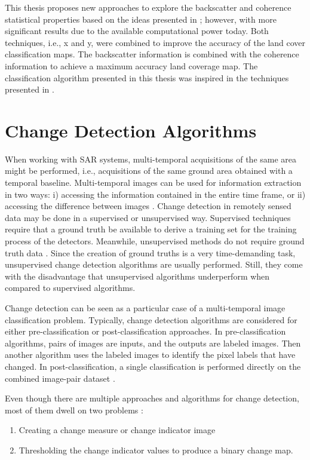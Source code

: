 This thesis proposes new approaches to explore the backscatter and coherence statistical properties based on the ideas presented in \cite{first_interferometric}; however, with more significant results due to the available computational power today. Both techniques, i.e., x and y, were combined to improve the accuracy of the land cover classification maps. The backscatter information is combined with the coherence information to achieve a maximum accuracy land coverage map. The classification algorithm presented in this thesis was inspired in the techniques presented in \cite{Paolathesis,Paolo, Martone, Martone2, Martone3, Rizzoli}. 

\section{Change Detection Algorithms}
When working with SAR systems, multi-temporal acquisitions of the same area might be performed, i.e., acquisitions of the same ground area obtained with a temporal baseline. Multi-temporal images can be used for information extraction in two ways: i) accessing the information contained in the entire time frame, or ii) accessing the difference between images \cite{change1}. Change detection in remotely sensed data may be done in a supervised or unsupervised way. Supervised techniques require that a ground truth be available to derive a training set for the training process of the detectors. Meanwhile, unsupervised methods do not require ground truth data \cite{change2,change3}. Since the creation of ground truths is a very time-demanding task, unsupervised change detection algorithms are usually performed. Still, they come with the disadvantage that unsupervised algorithms underperform when compared to supervised algorithms.

Change detection can be seen as a particular case of a multi-temporal image classification problem. Typically, change detection algorithms are considered for either pre-classification or post-classification approaches. In pre-classification algorithms, pairs of images are inputs, and the outputs are labeled images. Then another algorithm uses the labeled images to identify the pixel labels that have changed. In post-classification, a single classification is performed directly on the combined image-pair dataset \cite{change4}. 

Even though there are multiple approaches and algorithms for change detection, most of them dwell on two problems \cite{change5}:
\begin{enumerate}
    \item Creating a change measure or change indicator image
    \item Thresholding the change indicator values to produce a binary change map.
\end{enumerate}

